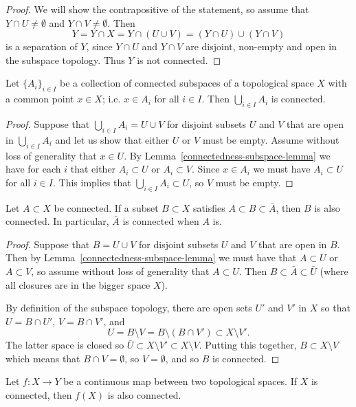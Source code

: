 \begin{proof}
  We will show the contrapositive of the statement, so assume that $Y \cap U \not= \emptyset$ and $Y \cap V \not= \emptyset$. Then
  \[
    Y = Y \cap X = Y \cap (U \cup V) = (Y \cap U) \cup (Y \cap V)
  \]
  is a separation of $Y$, since $Y \cap U$ and $Y \cap V$ are disjoint, non-empty and open in the subspace topology. Thus $Y$ is not connected.
\end{proof}
\begin{thm}
  \label{unions-connected}
  Let $\{A_i\}_{i \in I}$ be a collection of connected subspaces of a topological space $X$ with a common point $x \in X$; i.e. $x \in A_i$ for all $i \in I$. Then $\bigcup_{i \in I} A_i$ is connected.
\end{thm}
\begin{proof}
  Suppose that $\bigcup_{i \in I} A_i = U \cup V$ for disjoint subsets $U$ and $V$ that are open in $\bigcup_{i \in I} A_i$ and let us show that either $U$ or $V$ must be empty. Assume without loss of generality that $x \in U$. By Lemma~\ref{connectedness-subspace-lemma} we have for each $i$ that either $A_i \subset U$ or $A_i \subset V$. Since $x \in A_i$ we must have $A_i \subset U$ for all $i \in I$. This implies that $\bigcup_{i \in I} A_i \subset U$, so $V$ must be empty.
\end{proof}
\begin{thm}
  \label{connected-closures}
  Let $A \subset X$ be connected. If a subset $B \subset X$ satisfies $A \subset B \subset \bar A$, then $B$ is also connected. In particular, $\bar A$ is connected when $A$ is.
\end{thm}
\begin{proof}
  Suppose that $B = U \cup V$ for disjoint subsets $U$ and $V$ that are open in $B$. Then by Lemma~\ref{connectedness-subspace-lemma} we must have that $A \subset U$ or $A \subset V$, so assume without loss of generality that $A \subset U$. Then $B \subset \bar A \subset \bar U$ (where all closures are in the bigger space $X$).
  
  By definition of the subspace topology, there are open sets $U'$ and $V'$ in $X$ so that $U = B \cap U'$, $V = B \cap V'$, and
  \[
    U = B \setminus V = B \setminus (B \cap V') \subset X \setminus V'.
  \]
  The latter space is closed so $\bar U \subset X \setminus V' \subset X \setminus V$. Putting this together, $B \subset X \setminus V$ which means that $B \cap V = \emptyset$, so $V = \emptyset$, and so $B$ is connected.
\end{proof}
\begin{thm}
  \label{images-of-connected}
  Let $f : X \to Y$ be a continuous map between two topological spaces. If $X$ is connected, then $f(X)$ is also connected.
\end{thm}
